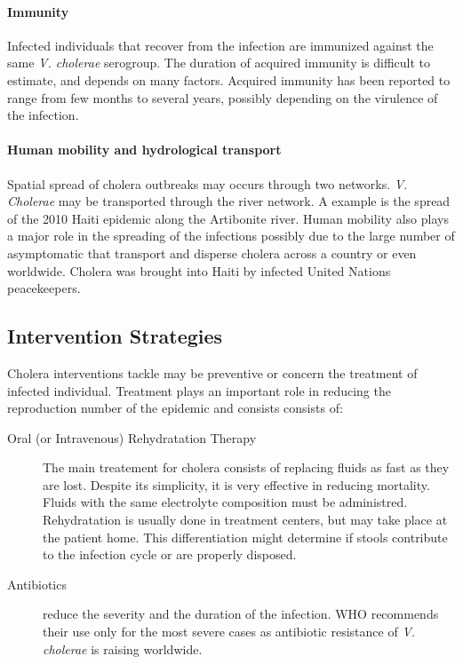 \paragraph{Immunity} Infected individuals that recover from the infection are immunized against the same \textit{V. cholerae} serogroup. The duration of acquired immunity is difficult to estimate, and depends on many factors. Acquired immunity has been reported to range from few months to several years, possibly depending on the virulence of the infection\cite{Levine:DurationInfectionDerivedImmunity:1981,Kaper:Cholera:1995,Woodward:CholeraReinfectionMan:1971,Glass:SeroepidemiologicalStudiesEI:1985,Clemens:BiotypeDeterminantNatural:1991,Leung:ProtectionAffordedPrevious:2021}.

\paragraph{Human mobility and hydrological transport} Spatial spread of cholera outbreaks may occurs through two networks. \textit{V. Cholerae} may be transported through the river network. A example is the spread of the 2010 Haiti epidemic along the Artibonite river\cite{Piarroux:UnderstandingCholeraEpidemic:2011}. Human mobility also plays a major role in the spreading of the infections possibly due to the large number of asymptomatic that transport and disperse cholera across a country or even worldwide.  Cholera was brought into Haiti by infected United Nations peacekeepers\cite{Piarroux:UnderstandingCholeraEpidemic:2011}. %

\subsection{Intervention Strategies} 
Cholera interventions tackle may be preventive or concern the treatment of infected individual. Treatment plays an important role in reducing the reproduction number of the epidemic and consists consists of:
\begin{description}
\item[Oral (or Intravenous) Rehydratation Therapy] The main treatement for cholera consists of replacing fluids as fast as they are lost. Despite its simplicity, it is very effective in reducing mortality. Fluids with the same electrolyte composition must be administred\cite{Kuhn:GlucoseNotRiceBased:2014}.  Rehydratation is usually done in treatment centers, but may take place at the patient home. This differentiation might determine if stools contribute to the infection cycle or are properly disposed.
\item[Antibiotics] reduce the severity and the duration of the infection. WHO recommends their use only for the most severe cases as antibiotic resistance of \emph{V. cholerae} is raising worldwide\cite{Sack:GettingSeriousCholera:2006}.
\end{description}

